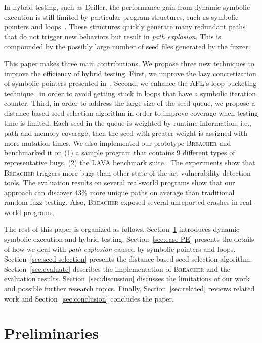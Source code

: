 \documentclass{cta-author}
\newcommand{\prototype}{\textsc{Breacher} }
\begin{document}
In hybrid testing, such as Driller, the performance gain from dynamic
symbolic execution is still limited by particular program
structures, such as symbolic pointers and loops~\cite{schwartz2010all,
	Boonstoppel:RAP, cadar2011symbolic, baldoni2016survey}. These structures
quickly generate many redundant paths that do not trigger new behaviors
but result in \textit{path explosion}. This is compounded by the possibly
large number of seed files generated by the fuzzer.

This paper makes three main contributions. We propose three new
techniques to improve the efficiency of hybrid testing. First, we
improve the lazy concretization of symbolic pointers presented
in~\cite{chipounov2011s2e}. Second, we enhance the AFL's loop bucketing
technique~\cite{online:afl} in order to avoid getting stuck in loops
that have a symbolic iteration counter. Third, in order to address the
large size of the seed queue, we propose a distance-based seed
selection algorithm in order to improve coverage when testing time is
limited. Each seed in the queue is weighted by runtime information, i.e.,
path and memory coverage, then the seed with greater weight is assigned with
more mutation times. We also 
implemented our prototype \prototype and benchmarked it on 
(1) a sample program that contains 9
different types of representative bugs, (2) the LAVA benchmark suite
\cite{dolan2016lava}. 
The experiments show that \prototype triggers more bugs
than other state-of-the-art vulnerability detection tools. 
The evaluation results on several real-world programs show that our approach can
discover 43\% more unique paths on average than traditional random fuzz
testing. Also, \prototype exposed several unreported crashes in real-world programs. 

The rest of this paper is organized as follows.
Section~\ref{sec:preliminaries} introduces dynamic symbolic execution
and hybrid testing. Section~\ref{sec:ease PE} presents the details of
how we deal with \textit{path explosion} caused by symbolic pointers
and loops. Section~\ref{sec:seed selection} presents the distance-based
seed selection algorithm. Section~\ref{sec:evaluate} describes the
implementation of \prototype and the evaluation results.
Section~\ref{sec:discussion} discusses the limitations of our work and
possible further research topics. Finally, Section~\ref{sec:related} reviews
related work and Section~\ref{sec:conclusion} concludes the paper.


\section{Preliminaries} \label{sec:preliminaries}
\end{document}
